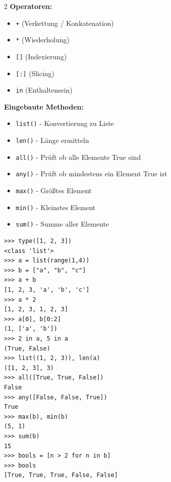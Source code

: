 \documentclass[ngerman,11pt]{article}
\begin{document}
\begin{multicols}{2}\raggedcolumns
\noindent\textbf{Operatoren:}
\begin{itemize}[leftmargin=*]
    \item \texttt{+} (Verkettung / Konkatenation)
    \item \texttt{*} (Wiederholung)
    \item \texttt{[]} (Indexierung)
    \item \texttt{[:]} (Slicing)
    \item \texttt{in} (Enthaltensein)
\end{itemize}
\par\bigskip

\noindent\textbf{Eingebaute Methoden:}
\begin{itemize}[leftmargin=*]
    \item \texttt{list()} - Konvertierung zu Liste
    \item \texttt{len()} - Länge ermitteln
    \item \texttt{all()} - Prüft ob alle Elemente True sind
    \item \texttt{any()} - Prüft ob mindestens ein Element True ist
    \item \texttt{max()} - Größtes Element
    \item \texttt{min()} - Kleinstes Element
    \item \texttt{sum()} - Summe aller Elemente
\end{itemize}
\columnbreak

\begin{lstlisting}
>>> type([1, 2, 3])
<class 'list'>
>>> a = list(range(1,4))
>>> b = ["a", "b", "c"]
>>> a + b
[1, 2, 3, 'a', 'b', 'c']
>>> a * 2
[1, 2, 3, 1, 2, 3]
>>> a[0], b[0:2]
(1, ['a', 'b'])
>>> 2 in a, 5 in a
(True, False)
>>> list((1, 2, 3)), len(a)
([1, 2, 3], 3)
>>> all([True, True, False])
False
>>> any([False, False, True])
True
>>> max(b), min(b)
(5, 1)
>>> sum(b)
15
>>> bools = [n > 2 for n in b]
>>> bools
[True, True, True, False, False]
\end{lstlisting}
\end{multicols}
\end{document}
